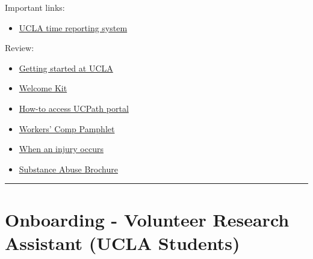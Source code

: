 \documentclass[]{book}
\providecommand{\tightlist}{%
  \setlength{\itemsep}{0pt}\setlength{\parskip}{0pt}}
\begin{document}
Important links:

\begin{itemize}
\tightlist
\item
  \href{24https://uctrs.it.ucla.edu/}{UCLA time reporting system}
\end{itemize}

Review:

\begin{itemize}
\tightlist
\item
  \href{https://www.chr.ucla.edu/new-employee/getting-started}{Getting started at UCLA}
\item
  \href{https://ucnet.universityofcalifornia.edu/forms/pdf/welcome-kit.pdf}{Welcome Kit}
\item
  \href{https://www.centralresourceunit.ucla.edu/s/}{How-to access UCPath portal}
\item
  \href{https://ucla.app.box.com/s/jyzoag8v9qw6katuvgegjil8an2tsx2j}{Workers' Comp
  Pamphlet}
\item
  \href{https://ucla.app.box.com/s/nua4ypfpjlt1226fusney4zyvo6qzzhj}{When an injury occurs}
\item
  \href{https://ucla.app.box.com/s/qrj4j7bnca1r8fy9n1bdfdf6orf1g0dq}{Substance Abuse Brochure}
\end{itemize}

\begin{center}\rule{0.5\linewidth}{0.5pt}\end{center}

\hypertarget{onboarding---volunteer-research-assistant-ucla-students}{%
\section{Onboarding - Volunteer Research Assistant (UCLA Students)}\label{onboarding---volunteer-research-assistant-ucla-students}}
\end{document}
